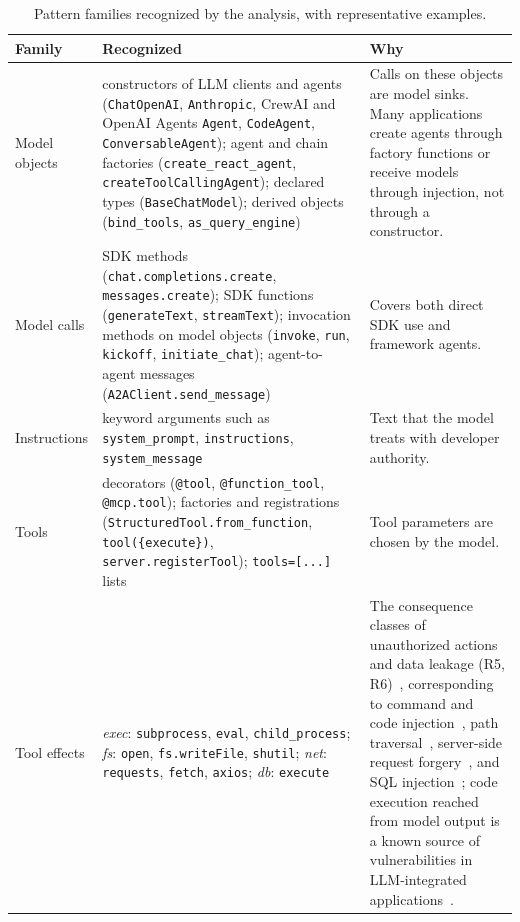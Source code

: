 \begin{table}[t]
\centering
\footnotesize
\renewcommand{\arraystretch}{1.2}
\setlength{\tabcolsep}{4pt}
\caption{Pattern families recognized by the analysis, with representative examples.}
\label{tab:df-recognition}
\begin{tabular}{@{}>{\raggedright\arraybackslash}p{}>{\raggedright\arraybackslash}p{}>{\raggedright\arraybackslash}p{}@{}}
\toprule
\textbf{Family} & \textbf{Recognized} & \textbf{Why} \\
\midrule
Model objects & constructors of LLM clients and agents (\texttt{ChatOpenAI}, \texttt{Anthropic}, CrewAI and OpenAI Agents \texttt{Agent}, \texttt{CodeAgent}, \texttt{ConversableAgent}); agent and chain factories (\texttt{create\_react\_agent}, \texttt{createToolCallingAgent}); declared types (\texttt{BaseChatModel}); derived objects (\texttt{bind\_tools}, \texttt{as\_query\_engine}) & Calls on these objects are model sinks. Many applications create agents through factory functions or receive models through injection, not through a constructor. \\
Model calls & SDK methods (\texttt{chat.completions.create}, \texttt{messages.create}); SDK functions (\texttt{generateText}, \texttt{streamText}); invocation methods on model objects (\texttt{invoke}, \texttt{run}, \texttt{kickoff}, \texttt{initiate\_chat}); agent-to-agent messages (\texttt{A2AClient.send\_message}) & Covers both direct SDK use and framework agents. \\
Instructions & keyword arguments such as \texttt{system\_prompt}, \texttt{instructions}, \texttt{system\_message} & Text that the model treats with developer authority. \\
Tools & decorators (\texttt{@tool}, \texttt{@function\_tool}, \texttt{@mcp.tool}); factories and registrations (\texttt{StructuredTool.from\_function}, \texttt{tool(\{execute\})}, \texttt{server.registerTool}); \texttt{tools=[...]} lists & Tool parameters are chosen by the model. \\
Tool effects & \emph{exec}: \texttt{subprocess}, \texttt{eval}, \texttt{child\_process}; \emph{fs}: \texttt{open}, \texttt{fs.writeFile}, \texttt{shutil}; \emph{net}: \texttt{requests}, \texttt{fetch}, \texttt{axios}; \emph{db}: \texttt{execute} & The consequence classes of unauthorized actions and data leakage (R5, R6)~\cite{owasp}, corresponding to command and code injection~\cite{cwe-78,cwe-94}, path traversal~\cite{cwe-22}, server-side request forgery~\cite{cwe-918}, and SQL injection~\cite{cwe-89}; code execution reached from model output is a known source of vulnerabilities in LLM-integrated applications~\cite{liu2024llmsmith}. \\

\end{tabular}
\end{table}
